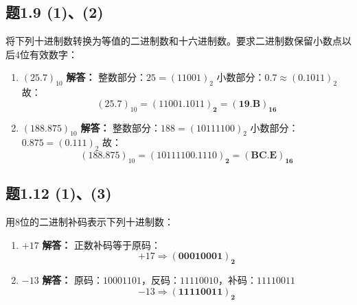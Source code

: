 \subsection{题1.9 (1)、(2)}
将下列十进制数转换为等值的二进制数和十六进制数。要求二进制数保留小数点以后4位有效数字：
\begin{enumerate}
    \item $(25.7)_{10}$
    \textbf{解答：}
    整数部分：$25 = (11001)_2$
    小数部分：$0.7 \approx (0.1011)_2$
    故：
    \[
    (25.7)_{10} = \mathbf{(11001.1011)_2} = \mathbf{(19.B)_{16}}
    \]

    \item $(188.875)_{10}$
    \textbf{解答：}
    整数部分：$188 = (10111100)_2$
    小数部分：$0.875 = (0.111)_2$
    故：
    \[
    (188.875)_{10} = \mathbf{(10111100.1110)_2} = \mathbf{(BC.E)_{16}}
    \]
\end{enumerate}

\subsection{题1.12 (1)、(3)}
用8位的二进制补码表示下列十进制数：
\begin{enumerate}
    \item $+17$
    \textbf{解答：}
    正数补码等于原码：
    \[
    +17 \Rightarrow \mathbf{(00010001)_2}
    \]

    \item $-13$
    \textbf{解答：}
    原码：$10001101$，反码：$11110010$，补码：$11110011$
    \[
    -13 \Rightarrow \mathbf{(11110011)_2}
    \]
\end{enumerate}